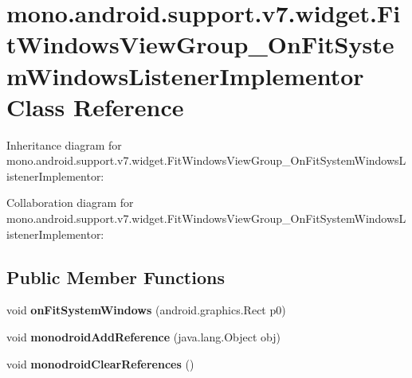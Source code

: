\hypertarget{classmono_1_1android_1_1support_1_1v7_1_1widget_1_1_fit_windows_view_group___on_fit_system_windows_listener_implementor}{}\section{mono.\+android.\+support.\+v7.\+widget.\+Fit\+Windows\+View\+Group\+\_\+\+On\+Fit\+System\+Windows\+Listener\+Implementor Class Reference}
\label{classmono_1_1android_1_1support_1_1v7_1_1widget_1_1_fit_windows_view_group___on_fit_system_windows_listener_implementor}


Inheritance diagram for mono.\+android.\+support.\+v7.\+widget.\+Fit\+Windows\+View\+Group\+\_\+\+On\+Fit\+System\+Windows\+Listener\+Implementor\+:


Collaboration diagram for mono.\+android.\+support.\+v7.\+widget.\+Fit\+Windows\+View\+Group\+\_\+\+On\+Fit\+System\+Windows\+Listener\+Implementor\+:
\subsection*{Public Member Functions}
\begin{DoxyCompactItemize}
\item 
\mbox{\label{classmono_1_1android_1_1support_1_1v7_1_1widget_1_1_fit_windows_view_group___on_fit_system_windows_listener_implementor_a3b95f689ada3045b02080434e45c441d}} 
void {\bfseries on\+Fit\+System\+Windows} (android.\+graphics.\+Rect p0)
\item 
\mbox{\label{classmono_1_1android_1_1support_1_1v7_1_1widget_1_1_fit_windows_view_group___on_fit_system_windows_listener_implementor_a49c02a17d05a6addb6953936c6e5f3fd}} 
void {\bfseries monodroid\+Add\+Reference} (java.\+lang.\+Object obj)
\item 
\mbox{\label{classmono_1_1android_1_1support_1_1v7_1_1widget_1_1_fit_windows_view_group___on_fit_system_windows_listener_implementor_af38b0cdcff94bdbd0459c313770f3389}} 
void {\bfseries monodroid\+Clear\+References} ()
\end{DoxyCompactItemize}
